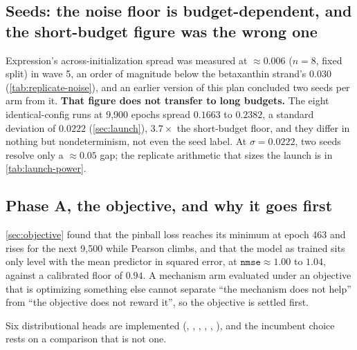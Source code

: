 \subsection{Seeds: the noise floor is budget-dependent, and the short-budget figure was the
wrong one}

Expression's across-initialization spread was measured at $\approx 0.006$ ($n = 8$, fixed
split) in wave 5, an order of magnitude below the betaxanthin strand's $0.030$
(\cref{tab:replicate-noise}), and an earlier version of this plan concluded two seeds per
arm from it. \textbf{That figure does not transfer to long budgets.} The eight
identical-config runs at 9,900 epochs spread $0.1663$ to $0.2382$, a standard deviation of
$\mathbf{0.0222}$ (\cref{sec:launch}), $3.7\times$ the short-budget floor, and they differ
in nothing but nondeterminism, not even the seed label. At $\sigma = 0.0222$, two seeds
resolve only a $\approx 0.05$ gap; the replicate arithmetic that sizes the launch is in
\cref{tab:launch-power}.

\subsection{Phase A, the objective, and why it goes first}

\cref{sec:objective} found that the pinball loss reaches its minimum at epoch 463 and
rises for the next 9,500 while Pearson climbs, and that the model as trained sits only level
with the mean predictor in squared error, at $\texttt{nmse} \approx 1.00$ to $1.04$, against
a calibrated floor of $0.94$. A mechanism arm evaluated under an objective that is optimizing
something else
cannot separate ``the mechanism does not help'' from ``the objective does not reward it'',
so the objective is settled first.

 Six distributional heads are implemented (, , ,
, , ), and the incumbent choice rests on a
comparison that is not one.

